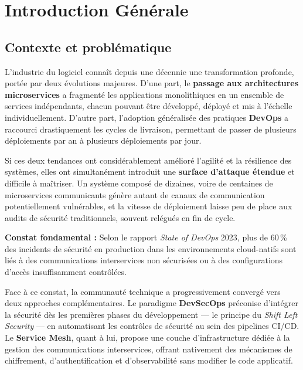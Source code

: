\chapter*{Introduction Générale}

\section*{Contexte et problématique}

L'industrie du logiciel connaît depuis une décennie une transformation profonde,
portée par deux évolutions majeures. D'une part, le \textbf{passage aux architectures
microservices} a fragmenté les applications monolithiques en un ensemble de services
indépendants, chacun pouvant être développé, déployé et mis à l'échelle
individuellement. D'autre part, l'adoption généralisée des pratiques
\textbf{DevOps} a raccourci drastiquement les cycles de livraison, permettant de
passer de plusieurs déploiements par an à plusieurs déploiements par jour.

Si ces deux tendances ont considérablement amélioré l'agilité et la résilience des
systèmes, elles ont simultanément introduit une \textbf{surface d'attaque étendue}
et difficile à maîtriser. Un système composé de dizaines, voire de centaines de
microservices communicants génère autant de canaux de communication potentiellement
vulnérables, et la vitesse de déploiement laisse peu de place aux audits de sécurité
traditionnels, souvent relégués en fin de cycle.

\begin{importantbox}
  \textbf{Constat fondamental :} Selon le rapport \textit{State of DevOps} 2023,
  plus de 60\,\% des incidents de sécurité en production dans les environnements
  cloud-natifs sont liés à des communications interservices non sécurisées ou à
  des configurations d'accès insuffisamment contrôlées.
\end{importantbox}

Face à ce constat, la communauté technique a progressivement convergé vers deux
approches complémentaires. Le paradigme \textbf{DevSecOps} préconise d'intégrer
la sécurité dès les premières phases du développement --- le principe du
\textit{Shift Left Security} --- en automatisant les contrôles de sécurité au sein
des pipelines CI/CD. Le \textbf{Service Mesh}, quant à lui, propose une couche
d'infrastructure dédiée à la gestion des communications interservices, offrant
nativement des mécanismes de chiffrement, d'authentification et d'observabilité
sans modifier le code applicatif.

